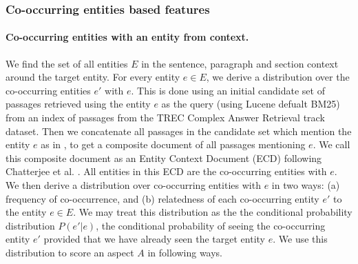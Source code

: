 \documentclass[sigconf,authordraft]{acmart}
\begin{document}
\subsubsection{Co-occurring entities based features}
\label{subsubsec:Co-occurring entities based features}

\paragraph{Co-occurring entities with an entity from context.}
We find the set of all entities $E$ in the sentence, paragraph and section context around the target entity. For every entity $e \in E$, we derive a distribution over the co-occurring entities $e'$ with $e$. This is done using an initial candidate set of passages retrieved using the entity $e$ as the query (using Lucene defualt BM25) from an index of passages from the TREC Complex Answer Retrieval \cite{dietz2018trec} track dataset. Then we concatenate all passages in the candidate set which mention the entity $e$ as in \cite{dalton2014entity,chatterjee2019why}, to get a composite document of all passages mentioning $e$. We call this composite document as an Entity Context Document (ECD) following Chatterjee et al. \cite{chatterjee2019why}. All entities in this ECD are the co-occurring entities with $e$. We then derive a distribution over co-occurring entities with $e$ in two ways: (a) frequency of co-occurrence, and (b) relatedness of each co-occurring entity $e'$ to the entity $e \in E$. We may treat this distribution as the the conditional probability distribution $P(e' \vert e)$, the conditional probability of seeing the co-occurring entity $e'$ provided that we have already seen the target entity $e$. 
We use this distribution to score an aspect $A$ in following ways.
\end{document}

